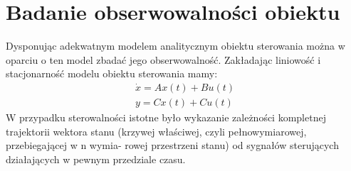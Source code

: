 \documentclass{article}
\begin{document}
	\maketitle
	\section{Badanie obserwowalności obiektu}
		Dysponując adekwatnym modelem analitycznym obiektu sterowania można w oparciu
		o ten model zbadać jego obserwowalność.
		Zakładając liniowość i stacjonarność modelu obiektu sterowania mamy:
		\begin{align*}
			\dot{x} = Ax(t)+Bu(t) \\
			y = Cx(t)+Cu(t) 
		\end{align*}
		W przypadku sterowalności istotne było wykazanie zależności kompletnej trajektorii
		wektora stanu (krzywej właściwej, czyli pełnowymiarowej, przebiegającej w n wymia-
		rowej przestrzeni stanu) od sygnałów sterujących działających w pewnym przedziale
		czasu.
\end{document}
